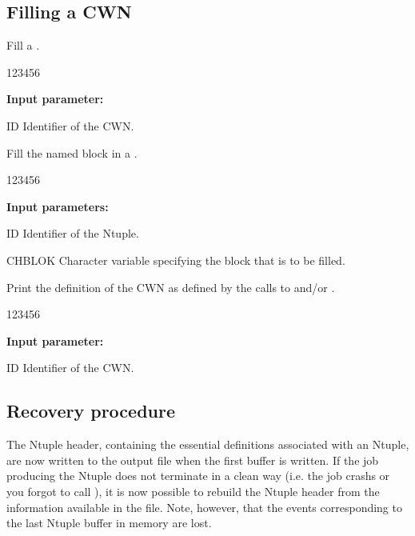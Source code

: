 \subsection{Filling a CWN}
\label{HNTUFILLT}


\Action Fill a \CWN{}.

\begin{DLttc}{123456}
\item[{\rm\bf Input parameter:}]
\item[ID] Identifier of the CWN{}.
\end{DLttc}
\Rind[HROPEN]{}
\Rind[HBNT]{}
\Rind[HBNAME]{}
\Rind[HBNAMC]{}
\Rind[HFNT]{}
\Rind[HROUT]{}
\Rind[HREND]{}



\Action Fill the named block  in a \CWN{}.

\begin{DLttc}{123456}
\item[{\rm\bf Input parameters:}]
\item[ID] Identifier of the Ntuple.
\item[CHBLOK]Character variable specifying the block that is to be filled.
\end{DLttc}


\Action Print the  definition of the CWN{}  as
defined by the calls to  and/or .

\begin{DLttc}{123456}
\item[{\rm\bf Input parameter:}]
\item[ID] Identifier of the CWN{}.
\end{DLttc}

\subsection*{Recovery procedure}
\label{sec:Ntuple-recovery}

The Ntuple header, containing the essential
definitions associated with an Ntuple,
are now written to the output file when the first
buffer is written.
If the job producing the Ntuple does not terminate in a clean way
(i.e. the job crashs or you forgot to call ),
it is now possible to rebuild the Ntuple header from the
information available in the file.
Note, however, that the events corresponding to the last
Ntuple buffer in memory are lost.

